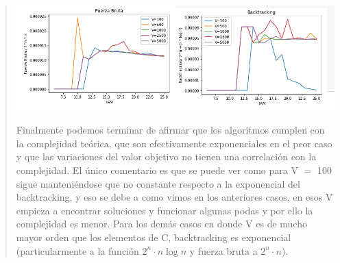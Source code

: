 \documentclass[8pt,a4paper]{article}
\begin{document}
\begin{verse}
\begin{center}
\includegraphics[scale=.8]{btvsbf.png}
\end{center}
Finalmente podemos terminar de afirmar que los algoritmos cumplen con la complejidad teórica, que son efectivamente exponenciales en el peor caso y que las variaciones del valor objetivo no tienen una correlación con la complejidad. El único comentario es que se puede ver como para V $=$ 100 sigue manteniéndose que no constante respecto a la exponencial del backtracking, y eso se debe a como vimos en los anteriores casos, en esos V empieza a encontrar soluciones y funcionar algunas podas y por ello la complejidad es menor. Para los demás casos en donde V es de mucho mayor orden que los elementos de C, backtracking es exponencial (particularmente a la función $2^{n} \cdot n \log{n}$ y fuerza bruta a $2^{n} \cdot n$).\\


\end{verse}
\end{document}
